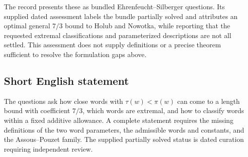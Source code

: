 \documentclass[11pt]{article}
\begin{document}
The record presents these as bundled Ehrenfeucht--Silberger questions. Its supplied dated assessment labels the bundle partially solved and attributes an optimal general \(7/3\) bound to Holub and Nowotka, while reporting that the requested extremal classifications and parameterized descriptions are not all settled. This assessment does not supply definitions or a precise theorem sufficient to resolve the formulation gaps above.
\subsection{Short English statement}
The questions ask how close words with \(\tau(w)<\pi(w)\) can come to a length bound with coefficient \(7/3\), which words are extremal, and how to classify words within a fixed additive allowance. A complete statement requires the missing definitions of the two word parameters, the admissible words and constants, and the Assous--Pouzet family. The supplied partially solved status is dated curation requiring independent review.
\end{document}
